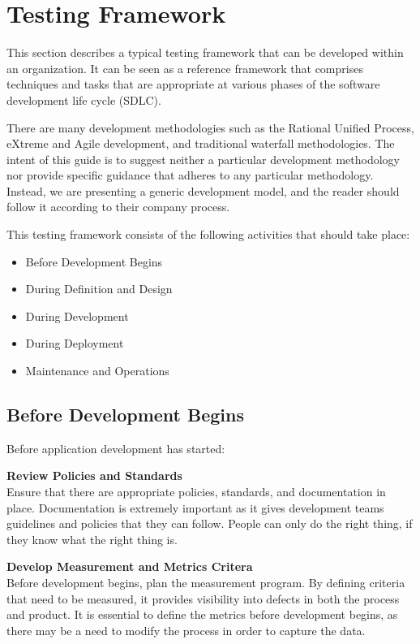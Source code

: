 \chapter{Testing Framework}

	This section describes a typical testing framework that can be developed within an organization. 
	It can be seen as a reference framework that comprises techniques and tasks that are appropriate 
	at various phases of the software development life cycle (SDLC).

	There are many development methodologies such as the Rational Unified Process, eXtreme and Agile 
	development, and traditional waterfall methodologies. The intent of this guide is to suggest
	neither a particular development methodology nor provide specific guidance that adheres to any 
	particular methodology. Instead, we are presenting a generic development model, and the reader 
	should follow it according to their company process.
	
	This testing framework consists of the following activities that should take place:
		\begin{itemize}
			\item Before Development Begins
			\item During Definition and Design
			\item During Development
			\item During Deployment
			\item Maintenance and Operations
		\end{itemize}

	\clearpage
	\section{Before Development Begins}
		Before application development has started:
		
		{\bf Review Policies and Standards} \\
			Ensure that there are appropriate policies, standards, and documentation in place. 
			Documentation is extremely important as it gives development teams guidelines and 
			policies that they can follow. People can only do the right thing, if they know what 
			the right thing is.

		{\bf Develop Measurement and Metrics Critera} \\
			Before development begins, plan the measurement program. By defining criteria that 
			need to be measured, it provides visibility into defects in both the process and product. 
			It is essential to define the metrics before development begins, as there may be a need 
			to modify the process in order to capture the data.

